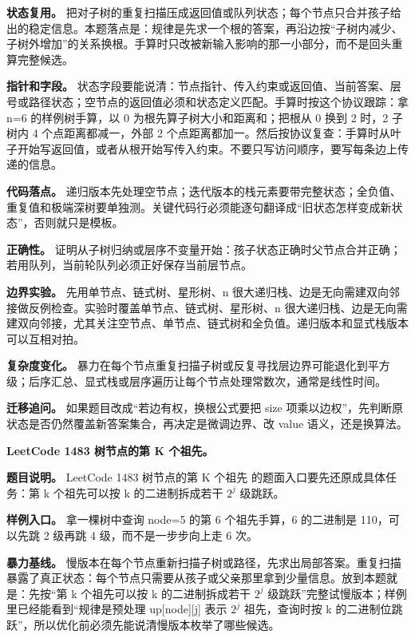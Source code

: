 \textbf{状态复用。} 把对子树的重复扫描压成返回值或队列状态；每个节点只合并孩子给出的稳定信息。本题落点是：规律是先求一个根的答案，再沿边按“子树内减少、子树外增加”的关系换根。手算时只改被新输入影响的那一小部分，而不是回头重算完整候选。

\textbf{指针和字段。} 状态字段要能说清：节点指针、传入约束或返回值、当前答案、层号或路径状态；空节点的返回值必须和状态定义匹配。手算时按这个协议跟踪：拿 n=6 的样例树手算，以 0 为根先算子树大小和距离和；把根从 0 换到 2 时，2 子树内 4 个点距离都减一，外部 2 个点距离都加一。然后按协议复查：手算时从叶子开始写返回值，或者从根开始写传入约束。不要只写访问顺序，要写每条边上传递的信息。

\textbf{代码落点。} 递归版本先处理空节点；迭代版本的栈元素要带完整状态；全负值、重复值和极端深树要单独测。关键代码行必须能逐句翻译成“旧状态怎样变成新状态”，否则就只是模板。

\textbf{正确性。} 证明从子树归纳或层序不变量开始：孩子状态正确时父节点合并正确；若用队列，当前轮队列必须正好保存当前层节点。

\textbf{边界实验。} 先用单节点、链式树、星形树、n 很大递归栈、边是无向需建双向邻接做反例检查。实验时覆盖单节点、链式树、星形树、n 很大递归栈、边是无向需建双向邻接，尤其关注空节点、单节点、链式树和全负值。递归版本和显式栈版本可以互相对拍。

\textbf{复杂度变化。} 暴力在每个节点重复扫描子树或反复寻找层边界可能退化到平方级；后序汇总、显式栈或层序遍历让每个节点处理常数次，通常是线性时间。

\textbf{迁移追问。} 如果题目改成“若边有权，换根公式要把 size 项乘以边权”，先判断原状态是否仍然覆盖新答案集合，再决定是微调边界、改 value 语义，还是换算法。

\noindent\textbf{LeetCode 1483 树节点的第 K 个祖先。}

\textbf{题目说明。} LeetCode 1483 树节点的第 K 个祖先 的题面入口要先还原成具体任务：第 k 个祖先可以按 k 的二进制拆成若干 \ensuremath{2^{j}} 级跳跃。

\textbf{样例入口。} 拿一棵树中查询 node=5 的第 6 个祖先手算，6 的二进制是 110，可以先跳 2 级再跳 4 级，而不是一步步向上走 6 次。

\textbf{暴力基线。} 慢版本在每个节点重新扫描子树或路径，先求出局部答案。重复扫描暴露了真正状态：每个节点只需要从孩子或父亲那里拿到少量信息。放到本题就是：先按“第 k 个祖先可以按 k 的二进制拆成若干 \ensuremath{2^{j}} 级跳跃”完整试慢版本；样例里已经能看到“规律是预处理 up[node][j] 表示 \ensuremath{2^{j}} 祖先，查询时按 k 的二进制位跳跃”，所以优化前必须先能说清慢版本枚举了哪些候选。

